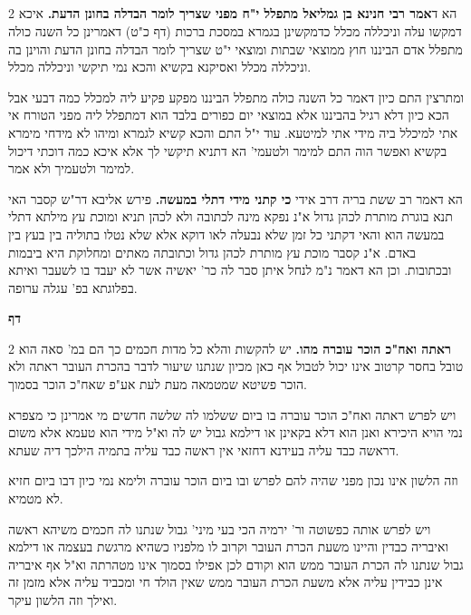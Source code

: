 \documentclass[12pt, openany]{book}
\newcommand{\sethebfont}{
\fontsize{10.5pt}{21.0pt} \selectfont
}
\newcommand{\twocol}[1]{
	{\sethebfont \begin{multicols}{2}
			#1
	\end{multicols}}	
}
\newcommand{\textblock}[1]{
{\sethebfont #1\\}	
}
\newcommand{\chapname}{}
\newcommand{\newchap}[1]{
	\addcontentsline{toc}{chapter}{#1}
	\renewcommand{\chapname}{#1}
		\begin{center}
			\textbf{%
\fontsize{16pt}{16pt}\selectfont
				#1}
		\end{center}
}
\begin{document}
\textblock{}{}
\textblock{}{}
\textblock{}{}
\textblock{}{}
\twocol{הא ד\textbf{אמר רבי חנינא בן גמליאל מתפלל י"ח מפני שצריך לומר הבדלה בחונן הדעת.}  איכא דמקשו עלה וניכללה מכלל כדמקשינן בגמרא במסכת ברכות (דף כ"ט) דאמרינן כל השנה כולה מתפלל אדם הביננו חוץ ממוצאי שבתות ומוצאי י"ט שצריך לומר הבדלה בחונן הדעת והוינן בה וניכללה מכלל ואסיקנא בקשיא והכא נמי תיקשי וניכללה מכלל.\par  ומתרצין התם כיון דאמר כל השנה כולה מתפלל הביננו מפקע פקיע ליה למכלל כמה דבעי אבל הכא כיון דלא רגיל בהביננו אלא במוצאי יום כפורים בלבד הוא דמתפלל ליה מפני הטורח אי אתי למיכלל ביה מידי אתי למיטעא. עוד י"ל התם והכא קשיא לגמרא ומיהו לא מידחי מימרא בקשיא ואפשר הוה התם למימר ולטעמי' הא דתניא תיקשי לך אלא איכא כמה דוכתי דיכול למימר ולטעמיך ולא אמר. 
\par הא דאמר רב ששת בריה דרב אידי \textbf{כי קתני מידי דתלי במעשה.}  פירש אליבא דר"ש קסבר האי תנא בוגרת מותרת לכהן גדול א"נ נפקא מינה לכתובה ולא לכהן תניא ומוכת עץ מילתא דתלי במעשה הוא והאי דקתני כל זמן שלא נבעלה לאו דוקא אלא שלא נטלו בתוליה בין בעץ בין באדם. א"נ קסבר מוכת עץ מותרת לכהן גדול וכתובתה מאתים ומחלוקת היא ביבמות ובכתובות. וכן הא דאמר נ"מ לנחל איתן סבר לה כר' יאשיה אשר לא יעבד בו לשעבר ואיתא בפלוגתא בפ' עגלה ערופה. 
\par}
\newchap{דף }
\twocol{\textbf{ראתה ואח"כ הוכר עוברה מהו.}  יש להקשות והלא כל מדות חכמים כך הם במ' סאה הוא טובל בחסר קרטוב אינו יכול לטבול אף כאן מכיון שנתנו שיעור לדבר בהכרת העובר ראתה ולא הוכר פשיטא שמטמאה מעת לעת אע"פ שאח"כ הוכר בסמוך.\par ויש לפרש ראתה ואח"כ הוכר עוברה בו ביום ששלמו לה שלשה חדשים מי אמרינן כי מצפרא נמי הויא היכירא ואנן הוא דלא בקאינן או דילמא גבול יש לה וא"ל מידי הוא טעמא אלא משום דראשה כבד עליה בעידנא דחזאי אין ראשה כבד עליה בתמיה הילכך דיה שעתא.\par  וזה הלשון אינו נכון מפני שהיה להם לפרש ובו ביום הוכר עוברה ולימא נמי כיון דבו ביום חזיא לא מטמיא.\par  ויש לפרש אותה כפשוטה ור' ירמיה הכי בעי מיני' גבול שנתנו לה חכמים משיהא ראשה ואיבריה כבדין והיינו משעת הכרת העובר וקרוב לו מלפניו כשהיא מרגשת בעצמה או דילמא גבול שנתנו לה הכרת העובר ממש הוא וקודם לכן אפילו בסמוך אינו מטהרתה וא"ל אף איבריה אינן כבידין עליה אלא משעת הכרת העובר ממש שאין הולד חי ומכביד עליה אלא מזמן זה ואילך וזה הלשון עיקר. 
\par}
\textblock{}{}
\textblock{}{}
\end{document}
